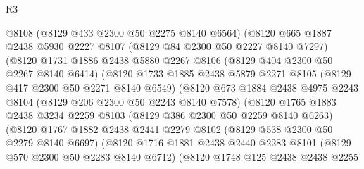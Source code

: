 \begin{lexlean}{R3}
\begin{coremodule}
                      @8108
                      (@8129 @433 @2300 @50 @2275 @8140 @6564)
                      (@8120
                        @665
                        @1887
                        @2438
                        @5930
                        @2227
                        @8107
                        (@8129 @84 @2300 @50 @2227 @8140 @7297)
                        (@8120
                          @1731
                          @1886
                          @2438
                          @5880
                          @2267
                          @8106
                          (@8129 @404 @2300 @50 @2267 @8140 @6414)
                          (@8120
                            @1733
                            @1885
                            @2438
                            @5879
                            @2271
                            @8105
                            (@8129 @417 @2300 @50 @2271 @8140 @6549)
                            (@8120
                              @673
                              @1884
                              @2438
                              @4975
                              @2243
                              @8104
                              (@8129 @206 @2300 @50 @2243 @8140 @7578)
                              (@8120
                                @1765
                                @1883
                                @2438
                                @3234
                                @2259
                                @8103
                                (@8129 @386 @2300 @50 @2259 @8140 @6263)
                                (@8120
                                  @1767
                                  @1882
                                  @2438
                                  @2441
                                  @2279
                                  @8102
                                  (@8129 @538 @2300 @50 @2279 @8140 @6697)
                                  (@8120
                                    @1716
                                    @1881
                                    @2438
                                    @2440
                                    @2283
                                    @8101
                                    (@8129 @570 @2300 @50 @2283 @8140 @6712)
                                    (@8120
                                      @1748
                                      @125
                                      @2438
                                      @2438
                                      @2255

\end{coremodule}
\end{lexlean}
